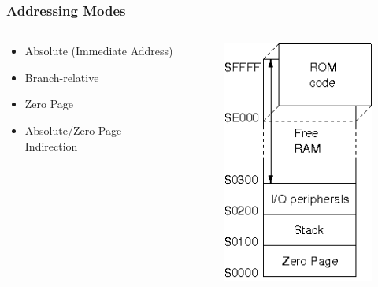 \documentclass{beamer}
\begin{document}
\begin{frame}
\frametitle{Addressing Modes}
\begin{columns}[T]
\begin{column}[T]{0.5\textwidth}
\begin{itemize}
\item Absolute (Immediate Address)
\item Branch-relative
\item Zero Page
\item Absolute/Zero-Page Indirection
\end{itemize}
\end{column}
\begin{column}[T]{0.5\textwidth}
\begin{figure}
\centering
\includegraphics[scale=0.6]{images/mmap.png}
\end{figure}
\end{column}
\end{columns}
\end{frame}
\end{document}

